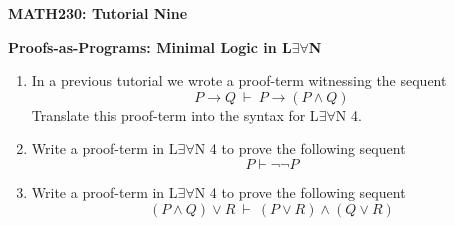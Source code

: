\documentclass[11pt]{report}
\begin{document}
	
	
\begin{center}
	{\bf MATH230: Tutorial Nine}
\end{center}
\begin{center}
	{\bf Proofs-as-Programs: Minimal Logic in L$\exists\forall$N}
\end{center}


\noindent{}
\newline
\vspace{0.5cm}


\begin{enumerate}

	\item In a previous tutorial we wrote a proof-term witnessing the sequent $$ P \rightarrow Q \ \vdash \ P \rightarrow ( P \land  Q)$$
	Translate this proof-term into the syntax for L$\exists\forall$N 4.

	\vspace{3cm}

	\item Write a proof-term in L$\exists\forall$N 4 to prove the following sequent $$ P\vdash \lnot \lnot  P$$
	 

	\vspace{3cm}

	\item Write a proof-term in L$\exists\forall$N 4 to prove the following sequent $$( P\land  Q) \lor  R \ \vdash \ ( P\lor  R) \land ( Q \lor  R)$$
	

\end{enumerate}
\end{document}
